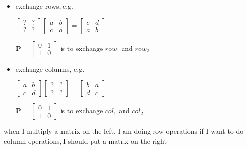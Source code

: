 \documentclass[12pt, a4paper]{article}
\begin{document}
\begin{itemize}
	\item exchange rows, e.g.
	\par 
	\begin{math}
		\begin{bmatrix}
			? & ? \\
			? & ?
		\end{bmatrix}
		\begin{bmatrix}
			a & b \\
			c & d
		\end{bmatrix}
		 = 
		\begin{bmatrix}
			c & d \\
			a & b
		\end{bmatrix}
	\end{math}
	\par ${\mathbf{P}}$ = 
	\begin{math}
		\begin{bmatrix}
			0 & 1 \\
			1 & 0
		\end{bmatrix}
	\end{math}
	is to exchange $row_1$ and $row_2$
	\item exchange columns, e.g.
	\par 
	\begin{math}
		\begin{bmatrix}
			a & b \\
			c & d
		\end{bmatrix}
		\begin{bmatrix}
			? & ? \\
			? & ?
		\end{bmatrix}
		= 
		\begin{bmatrix}
			b & a \\
			d & c
		\end{bmatrix}
	\end{math}
	\par ${\mathbf{P}}$ = 
	\begin{math}
		\begin{bmatrix}
			0 & 1 \\
			1 & 0
		\end{bmatrix}
	\end{math}
	is to exchange $col_1$ and $col_2$
\end{itemize}
\vspace{14pt}
{\textcolor{anhao-purple}{when I multiply a matrix on the left, I am doing row operations}}
\newline
{\textcolor{anhao-purple}{if I want to do column operations, I should put a matrix on the right}}
\end{document}
